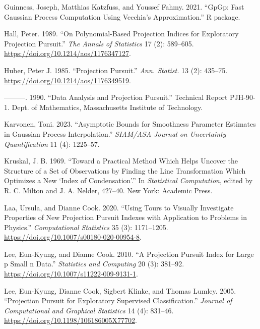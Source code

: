 \documentclass[
  12pt,
]{interact}
\newlength{\cslhangindent}
\newenvironment{CSLReferences}[2] %
 {\begin{list}{}{%
  \setlength{\itemindent}{0pt}
  \setlength{\leftmargin}{0pt}
  \setlength{\parsep}{0pt}
  \ifodd #1
   \setlength{\leftmargin}{\cslhangindent}
   \setlength{\itemindent}{-1\cslhangindent}
  \fi
  \setlength{\itemsep}{#2\baselineskip}}}
 {\end{list}}
\theoremstyle{plain}
\begin{document}
\begin{CSLReferences}{1}{0}
Guinness, Joseph, Matthias Katzfuss, and Youssef Fahmy. 2021. {``{GpGp}:
Fast {G}aussian Process Computation Using {V}ecchia's Approximation.''}
R package.

Hall, Peter. 1989. {``On Polynomial-Based Projection Indices for
Exploratory Projection Pursuit.''} \emph{The Annals of Statistics} 17
(2): 589--605. \url{https://doi.org/10.1214/aos/1176347127}.

Huber, Peter J. 1985. {``Projection Pursuit.''} \emph{Ann. Statist.} 13
(2): 435--75. \url{https://doi.org/10.1214/aos/1176349519}.

---------. 1990. {``Data Analysis and Projection Pursuit.''} Technical
Report PJH-90-1. Dept. of Mathematics, Massachusetts Institute of
Technology.

Karvonen, Toni. 2023. {``Asymptotic Bounds for Smoothness Parameter
Estimates in {G}aussian Process Interpolation.''} \emph{SIAM/ASA Journal
on Uncertainty Quantification} 11 (4): 1225--57.

Kruskal, J. B. 1969. {``Toward a Practical Method Which Helps Uncover
the Structure of a Set of Observations by Finding the Line
Transformation Which Optimizes a New {`Index of Condensation'}.''} In
\emph{Statistical Computation}, edited by R. C. Milton and J. A. Nelder,
427--40. New York: Academic Press.

Laa, Ursula, and Dianne Cook. 2020. {``Using Tours to Visually
Investigate Properties of New Projection Pursuit Indexes with
Application to Problems in Physics.''} \emph{Computational Statistics}
35 (3): 1171--1205. \url{https://doi.org/10.1007/s00180-020-00954-8}.

Lee, Eun-Kyung, and Dianne Cook. 2010. {``A Projection Pursuit Index for
Large p Small n Data.''} \emph{Statistics and Computing} 20 (3):
381--92. \url{https://doi.org/10.1007/s11222-009-9131-1}.

Lee, Eun-Kyung, Dianne Cook, Sigbert Klinke, and Thomas Lumley. 2005.
{``Projection Pursuit for Exploratory Supervised Classification.''}
\emph{Journal of Computational and Graphical Statistics} 14 (4):
831--46. \url{https://doi.org/10.1198/106186005X77702}.


\end{CSLReferences}
\end{document}
